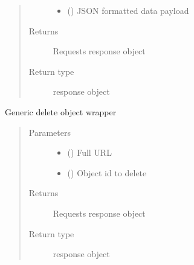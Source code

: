 \documentclass[letterpaper,10pt,english]{sphinxmanual}
\begin{document}
\begin{fulllineitems}
\begin{fulllineitems}
\begin{quote}
\begin{description}
\begin{itemize}
\item {} 
\sphinxAtStartPar
{} () \textendash{} JSON formatted data payload

\end{itemize}

\item[{Returns}] \leavevmode
\sphinxAtStartPar
Requests response object

\item[{Return type}] \leavevmode
\sphinxAtStartPar
response object

\end{description}\end{quote}

\end{fulllineitems}


\begin{fulllineitems}
\label{\detokenize{bloxone-class:bloxone.b1.delete}}
\sphinxAtStartPar
Generic delete object wrapper
\begin{quote}\begin{description}
\item[{Parameters}] \leavevmode\begin{itemize}
\item {} 
\sphinxAtStartPar
{} () \textendash{} Full URL

\item {} 
\sphinxAtStartPar
{} () \textendash{} Object id to delete

\end{itemize}

\item[{Returns}] \leavevmode
\sphinxAtStartPar
Requests response object

\item[{Return type}] \leavevmode
\sphinxAtStartPar
response object

\end{description}\end{quote}


\end{fulllineitems}
\end{fulllineitems}
\end{document}
